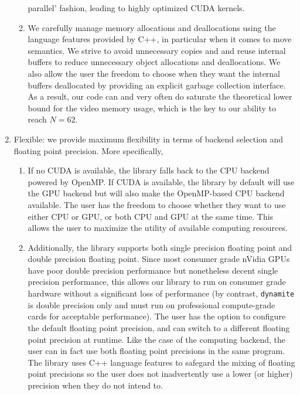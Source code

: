 \documentclass[preprint,12pt]{elsarticle}
\begin{document}
\begin{enumerate}
\begin{enumerate}
    parallel' fashion, leading to highly optimized CUDA kernels.
  \item We carefully manage memory allocations and deallocations using the language
    features provided by C++, in particular when it comes to move semantics. We strive to
    avoid unnecessary copies and and reuse internal buffers to reduce unnecessary object
    allocations and deallocations. We also allow the user the freedom to choose when they
    want the internal buffers deallocated by providing an explicit garbage collection
    interface. As a result, our code can and very often do saturate the theoretical lower
    bound for the video memory usage, which is the key to our ability to reach $N=62$.
  \end{enumerate}
\item Flexible: we provide maximum flexibility in terms of backend selection and floating point
  precision. More specifically,
  \begin{enumerate}
  \item If no CUDA is available, the library falls back to the CPU backend powered by OpenMP.
    If CUDA is available, the library by default will use the GPU backend but will also
    make the OpenMP-based CPU backend available. The user has the freedom to choose whether
    they want to use either CPU or GPU, or both CPU and GPU at the same time. This allows the
    user to maximize the utility of available computing resources.
  \item Additionally, the library supports both single precision floating point and double
    precision floating point. Since most consumer grade nVidia GPUs have poor double precision
    performance but nonetheless decent single precision performance, this allows our library
    to run on consumer grade hardware without a significant loss of performance (by contrast,
    {\tt dynamite} is double precision only and must run on professional compute-grade cards
    for acceptable performance). The user has the option to configure the default floating
    point precision, and can switch to a different floating point precision at runtime.
    Like the case of the computing backend, the user can in fact use both floating point
    precisions in the same program. The library uses C++ language features to safegard the
    mixing of floating point precisions so the user does not inadvertently use a lower
    (or higher) precision when they do not intend to.
  \end{enumerate}
\end{enumerate}
\end{document}
